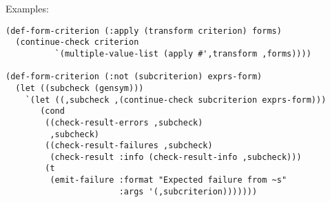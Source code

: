 Examples:
\begin{verbatim}
(def-form-criterion (:apply (transform criterion) forms)
  (continue-check criterion
		  `(multiple-value-list (apply #',transform ,forms))))

(def-form-criterion (:not (subcriterion) exprs-form)
  (let ((subcheck (gensym)))
    `(let ((,subcheck ,(continue-check subcriterion exprs-form)))
       (cond
        ((check-result-errors ,subcheck)
         ,subcheck)
        ((check-result-failures ,subcheck)
         (check-result :info (check-result-info ,subcheck)))
        (t
         (emit-failure :format "Expected failure from ~s"
                       :args '(,subcriterion)))))))
\end{verbatim}

